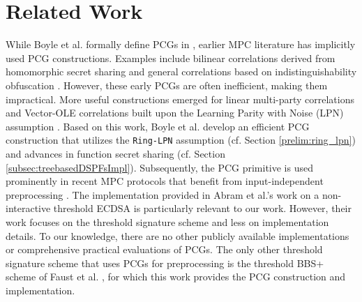 \section{Related Work}
While Boyle et al. formally define PCGs in \cite{boyle2019efficient}, earlier MPC literature has implicitly used PCG constructions. Examples include bilinear correlations derived from homomorphic secret sharing \cite{boyle2017homomorphic} and general correlations based on indistinguishability obfuscation \cite{halevi2016secure}. However, these early PCGs are often inefficient, making them impractical. More useful constructions emerged for linear multi-party correlations \cite{cramer2005share, gilboa1999compressing} and Vector-OLE correlations built upon the Learning Parity with Noise (LPN) assumption \cite{boyle2018compressingVole, schoppmann2019distributedVole}. Based on this work, Boyle et al. develop an efficient PCG construction \cite{boyle2019efficient, boyle2020efficient} that utilizes the \texttt{Ring-LPN} assumption (cf. Section \ref{prelim:ring_lpn}) and advances in function secret sharing \cite{boyle2015function, boyle2016function} (cf. Section \ref{subsec:treebasedDSPFsImpl}). Subsequently, the PCG primitive is used prominently in recent MPC protocols that benefit from input-independent preprocessing \cite{bui2022private, abram2022low, wagh2022barnowl, dittmer2022authenticated, faust2023non, kondi2023two, bui2023improved}. The implementation provided in Abram et al.'s work on a non-interactive threshold ECDSA \cite{abram2022low} is particularly relevant to our work. However, their work focuses on the threshold signature scheme and less on implementation details. To our knowledge, there are no other publicly available implementations or comprehensive practical evaluations of PCGs. The only other threshold signature scheme that uses PCGs for preprocessing is the threshold BBS+ scheme of Faust et al. \cite{faust2023non}, for which this work provides the PCG construction and implementation.
